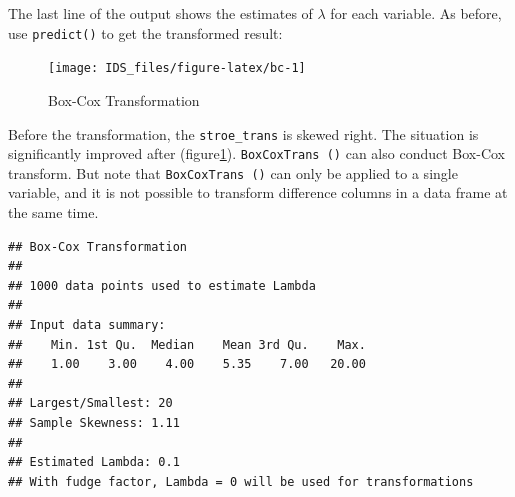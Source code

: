 \documentclass[12pt,]{krantz}
\newenvironment{Shaded}{\begin{snugshade}}{\end{snugshade}}
\newcommand{\KeywordTok}[1]{\textcolor[rgb]{0.13,0.29,0.53}{\textbf{{#1}}}}
\newcommand{\DataTypeTok}[1]{\textcolor[rgb]{0.13,0.29,0.53}{{#1}}}
\newcommand{\DecValTok}[1]{\textcolor[rgb]{0.00,0.00,0.81}{{#1}}}
\newcommand{\StringTok}[1]{\textcolor[rgb]{0.31,0.60,0.02}{{#1}}}
\newcommand{\NormalTok}[1]{{#1}}
\theoremstyle{definition}
\theoremstyle{definition}
\theoremstyle{remark}
\begin{document}
The last line of the output shows the estimates of \(\lambda\) for each
variable. As before, use \texttt{predict()} to get the transformed
result:

\begin{Shaded}
\end{Shaded}

\begin{figure}

{\centering \texttt{[image: IDS\_files/figure-latex/bc-1]} 

}

\caption{Box-Cox Transformation}\label{fig:bc}
\end{figure}

Before the transformation, the \texttt{stroe\_trans} is skewed right.
The situation is significantly improved after (figure\ref{fig:bc}).
\texttt{BoxCoxTrans\ ()} can also conduct Box-Cox transform. But note
that \texttt{BoxCoxTrans\ ()} can only be applied to a single variable,
and it is not possible to transform difference columns in a data frame
at the same time.

\begin{Shaded}
\end{Shaded}

\begin{verbatim}
## Box-Cox Transformation
## 
## 1000 data points used to estimate Lambda
## 
## Input data summary:
##    Min. 1st Qu.  Median    Mean 3rd Qu.    Max. 
##    1.00    3.00    4.00    5.35    7.00   20.00 
## 
## Largest/Smallest: 20 
## Sample Skewness: 1.11 
## 
## Estimated Lambda: 0.1 
## With fudge factor, Lambda = 0 will be used for transformations
\end{verbatim}
\end{document}
